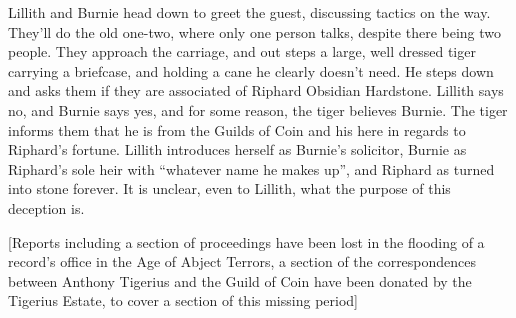 Lillith and Burnie head down to greet the guest, discussing tactics on the way. They’ll do the old one-two, where only one person talks, despite there being two people. They approach the carriage, and out steps a large, well dressed tiger carrying a briefcase, and holding a cane he clearly doesn't need. He steps down and asks them if they are associated of Riphard Obsidian Hardstone. Lillith says no, and Burnie says yes, and for some reason, the tiger believes Burnie. The tiger informs them that he is from the Guilds of Coin and his here in regards to Riphard’s fortune. Lillith introduces herself as Burnie’s solicitor, Burnie as Riphard’s sole heir with “whatever name he makes up”, and Riphard as turned into stone forever. It is unclear, even to Lillith, what the purpose of this deception is.\medskip

[Reports including a section of proceedings have been lost in the flooding of a record's office in the Age of Abject Terrors, a section of the correspondences between Anthony Tigerius and the Guild of Coin have been donated by the Tigerius Estate, to cover a section of this missing period]\medskip

